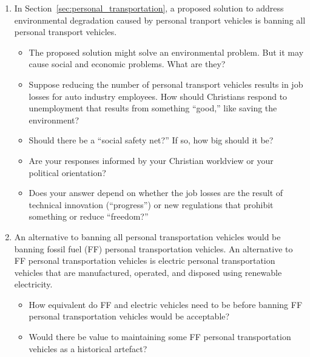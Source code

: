 \documentclass[12pt]{article}
\begin{document}
\begin{enumerate}
	
  \item In Section~\ref{sec:personal_transportation}, 
        a proposed solution to address environmental degradation caused by 
        personal tranport vehicles is banning all personal transport vehicles.
		\begin{itemize}

		  \item The proposed solution might solve an environmental problem. 
		        But it may cause social and economic problems. What are they?

		  \item Suppose reducing the number of personal transport vehicles 
		        results in job losses for auto industry employees. 
				How should Christians respond to unemployment that results 
				from something ``good,'' like saving the environment? 

		  \item	Should there be a ``social safety net?'' If so, how big should it be? 
		  
		  \item Are your responses informed by your Christian worldview or your political orientation?  
		  
		  \item Does your answer depend on whether the job losses are the result 
		        of technical innovation (``progress'') or new regulations
				that prohibit something or reduce ``freedom?''
				
		\end{itemize}

  \item An alternative to banning all personal transportation vehicles would be banning 
        fossil fuel (FF) personal transportation vehicles. 
		An alternative to FF personal transportation vehicles is electric personal transportation vehicles
		that are manufactured, operated, and disposed using renewable electricity.  
		
		\begin{itemize}

		  \item How equivalent do FF and electric vehicles need to be before banning FF
		        personal transportation vehicles would be acceptable?
		
		  \item Would there be value to maintaining some FF personal transportation vehicles 
		        as a historical artefact? 


\end{itemize}
\end{enumerate}
\end{document}
